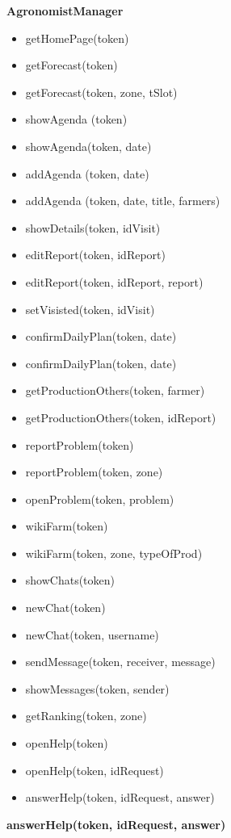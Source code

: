 \textbf{AgronomistManager}
\begin{itemize}
    \item getHomePage(token)
    \item getForecast(token)
    \item getForecast(token, zone, tSlot)
    \item showAgenda (token)
    \item showAgenda(token, date)
    \item addAgenda (token, date)
    \item addAgenda (token, date, title, farmers)
    \item showDetails(token, idVisit)
    \item editReport(token, idReport)
    \item editReport(token, idReport, report)
    \item setVisisted(token, idVisit)
    \item confirmDailyPlan(token, date)
    \item confirmDailyPlan(token, date)
    \item getProductionOthers(token, farmer)
    \item getProductionOthers(token, idReport)
    \item reportProblem(token)
    \item reportProblem(token, zone)
    \item openProblem(token, problem)
    \item wikiFarm(token)
    \item wikiFarm(token, zone, typeOfProd)
    \item showChats(token)
    \item newChat(token)
    \item newChat(token, username)
    \item sendMessage(token, receiver, message)
    \item showMessages(token, sender)
    \item getRanking(token, zone)
    \item openHelp(token)
    \item openHelp(token, idRequest)
    \item answerHelp(token, idRequest, answer)
\end{itemize}
\textbf{answerHelp(token, idRequest, answer)}
